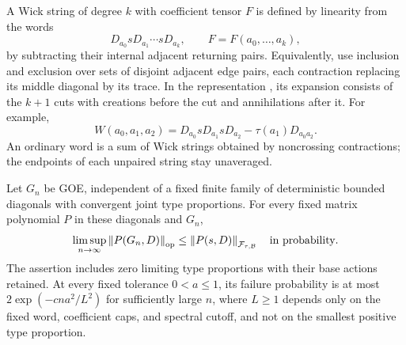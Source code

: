 A Wick string of degree $k$ with coefficient tensor $F$ is defined
by linearity from the words
\[
 D_{a_0}sD_{a_1}\cdots sD_{a_k},
 \qquad F=F(a_0,\ldots,a_k),
\]
by subtracting their internal adjacent returning pairs.  Equivalently, use inclusion and
exclusion over sets of disjoint adjacent edge pairs, each contraction
replacing its middle diagonal by its trace.  In the representation
, its expansion consists of the $k+1$ cuts
with creations before the cut and annihilations after it.  For example,
\[
 W(a_0,a_1,a_2)
 =D_{a_0}sD_{a_1}sD_{a_2}
             -\tau(a_1)D_{a_0a_2}.
\]
An ordinary word is a sum of Wick strings obtained by noncrossing
contractions; the endpoints of each unpaired string stay unaveraged.

\begin{lemma}
\label{lem:path-fock-norm}
Let $G_n$ be GOE, independent of a fixed finite family of deterministic
bounded diagonals with convergent joint type proportions.  For every
fixed matrix polynomial $P$ in these diagonals and $G_n$,
\begin{equation}
 \limsup_{n\to\infty}\left\lVert P(G_n,D)\right\rVert_{\mathrm{op}}
 \le\left\lVert P(s,D)\right\rVert_{\mathcal F_{\tau,\mathcal B}}
 \quad\text{in probability}.
 \label{eq:path-fock-domination}
\end{equation}
The assertion includes zero limiting type proportions with their base
actions retained.  At every fixed tolerance $0<a\le1$, its failure
probability is at most $2\exp(-cna^2/L^2)$ for sufficiently large $n$,
where $L\ge1$ depends only on the fixed word, coefficient caps, and spectral
cutoff, and not on the smallest positive type proportion.
\end{lemma}

